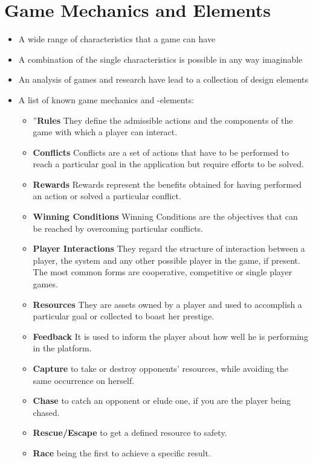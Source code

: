 \documentclass{article}
\theoremstyle{definition}
\theoremstyle{remark}
\begin{document}
\section{Game Mechanics and Elements}
\begin{itemize}
    \item A wide range of characteristics that a game can have
    \item A combination of the single characteristics is possible in any way imaginable
    \item An analysis of games and research have lead to a collection of design elements
    \item A list of known game mechanics and -elements:
    \begin{itemize}
        \item ''\textbf{Rules} They define the admissible actions and the components of the game with which a player can interact.
        \item \textbf{Conflicts} Conflicts are a set of actions that have to be performed to reach a particular goal in the application but require efforts to be solved.
        \item \textbf{Rewards} Rewards represent the benefits obtained for having performed an action or solved a particular conflict.
        \item \textbf{Winning Conditions} Winning Conditions are the objectives that can be reached by overcoming particular conflicts.
        \item \textbf{Player Interactions} They regard the structure of interaction between a player, the system and any other possible player in the game, if present. The most common forms are cooperative, competitive or single player games.
        \item \textbf{Resources} They are assets owned by a player and used to accomplish a particular goal or collected to boast her prestige.
        \item \textbf{Feedback} It is used to inform the player about how well he is performing in the platform.
        \item \textbf{Capture} to take or destroy opponents’ resources, while avoiding the same occurrence on herself.
        \item \textbf{Chase} to catch an opponent or elude one, if you are the player being chased.
        \item \textbf{Rescue/Escape} to get a defined resource to safety.
        \item \textbf{Race} being the first to achieve a specific result.

\end{itemize}
\end{itemize}
\end{document}
